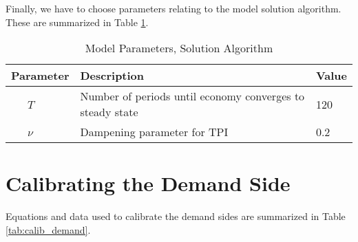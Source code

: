 \documentclass[article,11pt,letterpaper,fleqn]{article}
\theoremstyle{definition}
\numberwithin{equation}{section}
\begin{document}
Finally, we have to choose parameters relating to the model solution algorithm.  These are summarized in Table \ref{tab:params_TPI}.

\begin{table}[htbp]
  \centering
  \caption{Model Parameters, Solution Algorithm}
    \begin{tabular}{lll}
    \hline
    \hline
    Parameter & Description & Value \\
    \hline
    \ \ \ $T$ & Number of periods until economy converges to steady state & 120 \\
    \ \ \ $\nu$ & Dampening parameter for TPI & 0.2 \\
    \hline
    \hline
    \end{tabular}%
  \label{tab:params_TPI}%
\end{table}%


\section{Calibrating the Demand Side}
\label{sec:demand_calib}

Equations and data used to calibrate the demand sides are summarized in Table \ref{tab:calib_demand}.
\end{document}
